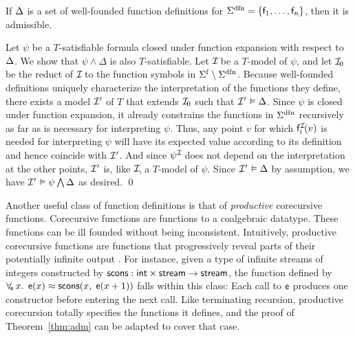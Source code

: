 \begin{theorem}\label{thm:adm}
If $\DDD$ is a set of well-founded function definitions for\/
$\sfundefs{\Sigma} = \{\con{f}_1,\dotsc,\con{f}_n\}$, then it is admissible.
\end{theorem}

\begin{proofsketch}
Let $\psi$ be a $T$-satisfiable formula closed under function expansion with
respect to $\DDD$. We show that $\psi \wedge \Delta$ is also
$T$-satisfiable. Let $\mathcal{I\!}$ be a $T$-model of $\psi$, and
let $\mathcal{I\!}_0$ be the reduct of $\mathcal{I\!}$ to the function symbols in $\sfuns{\Sigma} \setminus
\sfundefs{\Sigma}$. Because well-founded definitions uniquely characterize
the interpretation of the functions they define, there exists a
model ${\mathcal{I}'}$ of $T$ that extends $\mathcal{I\!}_0$ such that $\J \models \Delta$.
%
Since $\psi$ is closed under function expansion, it already constrains the
functions in $\sfundefs{\Sigma}$ recursively as far as is
necessary for interpreting $\psi$. Thus, any point $v$ for which
$\mathsf{f}_i^{\mathcal{I\!}}(v)$ is needed for interpreting $\psi$ will have its
expected value according to its definition and hence coincide with ${\mathcal{I}'}$.
And since $\psi^{\mathcal{I\!}}$ does not depend on the interpretation at the other
points, ${\mathcal{I}'}$ is, like $\mathcal{I\!}$, a $T$-model of $\psi$.
Since $\J \models \Delta$ by assumption, we have $\J \models \psi
\bigwedge \Delta$ as desired.
\qed
\end{proofsketch}


Another useful class of function definitions is that of
\emph{productive} corecursive functions. Corecursive functions are functions to
a coalgebraic datatype. These functions can be ill founded without being inconsistent. 
Intuitively, productive corecursive functions are functions that
progressively reveal parts of their potentially infinite
output \cite{turner-1995,mcbride-productive}.
For instance, given a type of infinite streams of integers constructed by
$\mathsf{scons} : \mathsf{int} \times \mathsf{stream} \to\allowbreak \mathsf{stream}$,
the function defined by
$\forall_{\!\mathsf{e}\:} x.\;\, \mathsf{e}(x) \approx \mathsf{scons}(x,\; \mathsf{e}(x + 1))$
falls within this class: Each call to $\mathsf{e}$ produces one
constructor before entering the next call. Like terminating recursion,
productive corecursion totally specifies the functions it defines,
and the proof of Theorem~\ref{thm:adm} can be adapted to cover that case.

